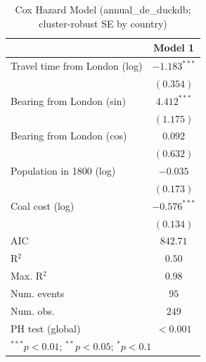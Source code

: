 
\begin{table}
\begin{center}
\begin{tabular}{l c}
\hline
 & Model 1 \\
\hline
Travel time from London (log) & $-1.183^{***}$ \\
 & $(0.354)$ \\
Bearing from London (sin) & $4.412^{***}$ \\
 & $(1.175)$ \\
Bearing from London (cos) & $0.092$ \\
 & $(0.632)$ \\
Population in 1800 (log) & $-0.035$ \\
 & $(0.173)$ \\
Coal cost (log) & $-0.576^{***}$ \\
 & $(0.134)$ \\
\hline
AIC              & $842.71$ \\
R$^2$            & $0.50$ \\
Max. R$^2$       & $0.98$ \\
Num. events      & $95$ \\
Num. obs.        & $249$ \\
PH test (global) & $<0.001$ \\
\hline
\multicolumn{2}{l}{\scriptsize{$^{***}p<0.01$; $^{**}p<0.05$; $^{*}p<0.1$}}
\end{tabular}
\caption{Cox Hazard Model (annual\_de\_duckdb; cluster-robust SE by country)}
\label{tab:cox_serious_annual_de_duckdb}
\end{center}
\end{table}
